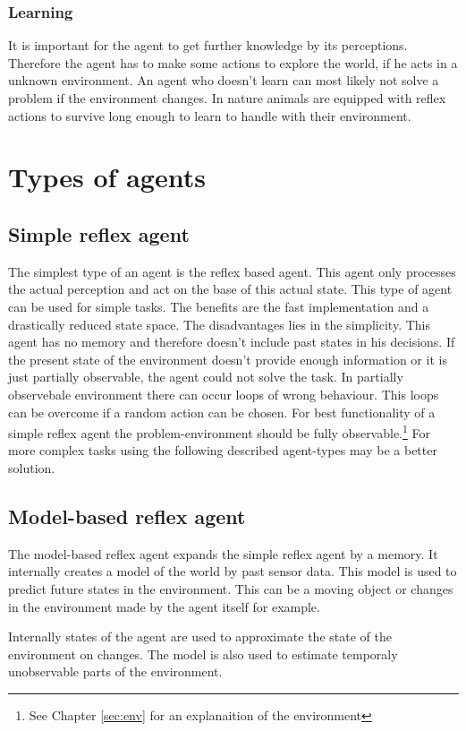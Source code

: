 \documentclass[10pt,a4paper,DIV=11]{scrreprt}
\begin{document}
\subsubsection{Learning}
It is important for the agent to get further knowledge by its perceptions. Therefore the agent has to make some actions to explore the world, if he acts in a unknown environment.
An agent who doesn't learn can most likely not solve a problem if the environment changes.
In nature animals are equipped with reflex actions to survive long enough to learn to handle with their environment.

\section{Types of agents}

\subsection{Simple reflex agent}
The simplest type of an agent is the reflex based agent.
This agent only processes the actual perception and act on the base of this actual state. This type of agent can be used for simple tasks. The benefits are the fast implementation and a drastically reduced state space.
The disadvantages lies in the simplicity. This agent has no memory and therefore doesn't include past states in his decisions. If the present state of the environment doesn't provide enough information or it is just partially observable, the agent could not solve the task.
In partially observebale environment there can occur loops of wrong behaviour. This loops can be overcome if a random action can be chosen.
For best functionality of a simple reflex agent the problem-environment should be fully observable.\footnote{See Chapter \ref{sec:env} for an explanaition of the environment}
For more complex tasks using the following described agent-types may be a better solution.

\subsection{Model-based reflex agent}
The model-based reflex agent expands the simple reflex agent by a memory. It internally creates a model of the world by past sensor data. This model is used to predict future states in the environment.
This can be a moving object or changes in the environment made by the agent itself for example.

Internally states of the agent are used to approximate the state of the environment on changes. 
The model is also used to estimate temporaly unobservable parts of the environment.
\end{document}
